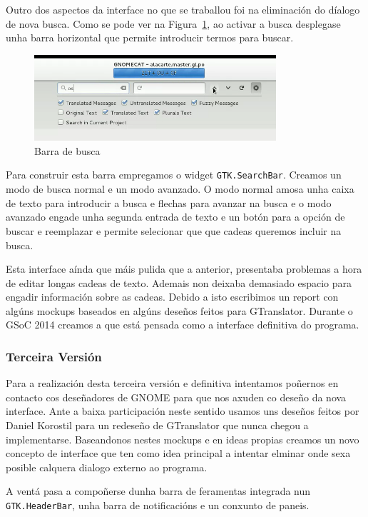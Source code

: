 Outro dos aspectos da interface no que se traballou foi na eliminación do díalogo de nova busca. Como se pode ver na Figura~\ref{fig:ui:v2:search}, ao activar a busca desplegase unha barra horizontal que permite introducir termos para buscar.

\begin{figure}[h!]
  \centering
    \includegraphics[width=0.8\textwidth]{img/curso2014_it2_search.png}
    \caption{Barra de busca}
    \label{fig:ui:v2:search}
\end{figure}

Para construir esta barra empregamos o widget \lstinline{GTK.SearchBar}. Creamos un modo de busca normal e un modo avanzado. O modo normal amosa unha caixa de texto para introducir a busca e flechas para avanzar na busca e o modo avanzado engade unha segunda entrada de texto e un botón para a opción de buscar e reemplazar e permite selecionar que que cadeas queremos incluir na busca.

Esta interface aínda que máis pulida que a anterior, presentaba problemas a hora de editar longas cadeas de texto. Ademais non deixaba demasiado espacio para engadir información sobre as cadeas. Debido a isto escribimos un report con algúns mockups baseados en algúns deseños feitos para GTranslator. Durante o GSoC 2014 creamos a que está pensada como a interface definitiva do programa.

\subsubsection{Terceira Versión}
Para a realización desta terceira versión e definitiva intentamos poñernos en contacto cos deseñadores de GNOME para que nos axuden co deseño da nova interface. Ante a baixa participación neste sentido usamos uns deseños feitos por Daniel Korostil para un redeseño de GTranslator que nunca chegou a implementarse. Baseandonos nestes mockups e en ideas propias creamos un novo concepto de interface que ten como idea principal a intentar elminar onde sexa posible calquera dialogo externo ao programa.

A ventá pasa a compoñerse dunha barra de feramentas integrada nun \lstinline{GTK.HeaderBar}, unha barra de notificacións e un conxunto de paneis.


